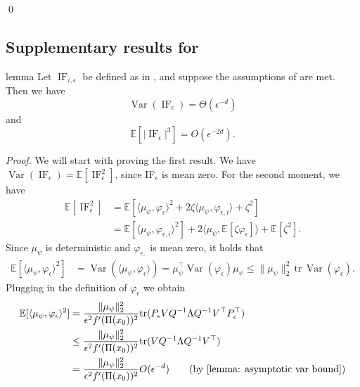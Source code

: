 \documentclass[11pt]{article}
\begin{document}
\qed{}

\subsection{Supplementary results for }

\begin{restatable}{lemma}{}
  Let $\operatorname{IF}_{i, \epsilon}$ be defined as in , and suppose the assumptions of  are met. Then we have
  \[\operatorname{Var}(\operatorname{IF}_{\epsilon}) = \Theta(\epsilon^{-d})\]
  and 
  \[\mathbb{E}[|\operatorname{IF}_{\epsilon}|^3] = O(\epsilon^{-2d}).\]
  \label{lemma: if bound}
\end{restatable}
\noindent \textit{Proof.} We will start with proving the first result. We have $\operatorname{Var}(\operatorname{IF}_{ \epsilon}) = \mathbb{E}[\operatorname{IF}_{\epsilon}^2]$, since IF$_{ \epsilon}$ is mean zero. For the second moment, we have
\begin{align*}
    \mathbb{E}[\operatorname{IF}_{\epsilon}^2] &= \mathbb{E}[\langle \mu_{\psi}, \varphi_{\epsilon}\rangle^2 + 2\zeta\langle \mu_{\psi}, \varphi_{\epsilon, i}\rangle + \zeta^2] \\
    &= \mathbb{E}[\langle \mu_{\psi}, \varphi_{\epsilon, i}\rangle^2] + 2\langle \mu_{\psi}, \mathbb{E}[\zeta \varphi_{ \epsilon}]\rangle + \mathbb{E}[\zeta^2]. 
\end{align*}
Since $\mu_\psi$ is deterministic and $\varphi_{\epsilon,}$ is mean zero, it holds that 
\begin{align*}
    \mathbb{E}[\langle \mu_{\psi}, \varphi_{\epsilon}\rangle^2] &= \operatorname{Var}(\langle \mu_\psi, \varphi_{\epsilon}\rangle)  = \mu_\psi^{\top}\operatorname{Var}(\varphi_{\epsilon})\mu_\psi \leq \|\mu_\psi\|_2^2\,\text{tr}\,\operatorname{Var}(\varphi_{\epsilon}).
\end{align*}
Plugging in the definition of $\varphi_{\epsilon}$ we obtain
\begin{align*}
\mathbb{E}[\langle \mu_{\psi}, \varphi_{\epsilon}\rangle^2] &= \frac{\|\mu_\psi\|_2^2}{\epsilon^2f'(\Pi(x_0))^2}\text{tr}(P_{\epsilon}VQ^{-1}\Lambda Q^{-1}V^{\top}P_{\epsilon}^{\top}) \\
&\leq \frac{\|\mu_\psi\|_2^2}{\epsilon^2f'(\Pi(x_0))^2}\text{tr}(VQ^{-1}\Lambda Q^{-1}V^{\top}) \\
&= \frac{\|\mu_\psi\|_2^2}{\epsilon^2f'(\Pi(x_0))^2}O(\epsilon^{-d}) \tag{by \Cref{lemma: asymptotic var bound}}
\end{align*}
\end{document}

